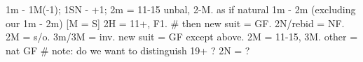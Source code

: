1m - 1M(-1); 1SN - +1; 
2m = 11-15 unbal, 2-M. as if natural 1m - 2m (excluding our 1m - 2m)
    [M = S] 2H = 11+, F1.  # then new suit = GF. 2N/rebid = NF.
    2M = s/o. 3m/3M = inv. new suit = GF except above.
2M = 11-15, 3M.
other = nat GF  # note: do we want to distinguish 19+ ? 2N = ?